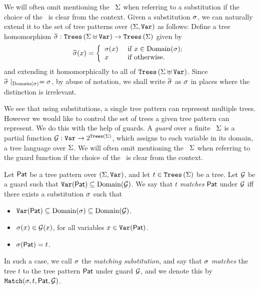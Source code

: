 We will often omit mentioning the \rab\ $\Sigma$ when referring to a substitution if the choice of the \rab\ is clear from the context.
Given a substitution $\sigma$, we can naturally extend it to the set of tree patterns over $(\Sigma, \texttt{Var})$ as follows: Define a tree homomorphism $\widetilde{\sigma} : \texttt{Trees}\left(\Sigma \uplus \texttt{Var}\right) \to \texttt{Trees}\left(\Sigma\right)$ given by
\[ \widetilde{\sigma}(x) = \left\{ \begin{array}{ll} \sigma(x) & \mbox{ if } x \in \operatorname{Domain}(\sigma);\\ x & \mbox{ if } \mbox{otherwise}. \end{array} \right. \]
and extending it homomorphically to all of $\texttt{Trees}\left(\Sigma \uplus \texttt{Var}\right)$.
Since $\widetilde{\sigma} \mid_{\operatorname{Domain}(\sigma)} = \sigma$, by abuse of notation, we  shall write $\widetilde{\sigma}$ as $\sigma$ in places where the distinction is irrelevant.

We see that using substitutions, a single tree pattern can represent multiple trees. However we would like to control the set of trees a given tree pattern can represent. We do this with the help of guards. A \emph{guard} over a finite \rab\ $\Sigma$ is a partial function $\mathcal{G} : \texttt{Var} \to 2^{\texttt{Trees}\left(\Sigma\right)}$, which assigns to each variable in its domain, a tree language over $\Sigma$. We will often omit mentioning the \rab\ $\Sigma$ when referring to the guard function if the choice of the \rab\ is clear from the context.


\begin{definition}[Match]\label{def:match}
    Let $\mathsf{Pat}$ be a tree pattern over $(\Sigma, \texttt{Var})$, and let $t \in \texttt{Trees}\left(\Sigma\right)$ be a tree. Let $\mathcal{G}$ be a guard such that $\texttt{Var}(\mathsf{Pat}) \subseteq \operatorname{Domain}(\mathcal{G})$. We say that $t$ \emph{matches} $\mathsf{Pat}$ under $\mathcal{G}$ iff there exists a substitution $\sigma$ such that
    \begin{itemize}
        \item $\texttt{Var}(\mathsf{Pat}) \subseteq \operatorname{Domain}(\sigma) \subseteq \operatorname{Domain}(\mathcal{G})$.
        \item $\sigma(x) \in \mathcal{G}(x)$, for all variables $x \in \texttt{Var}(\mathsf{Pat})$.
        \item $\sigma(\mathsf{Pat}) = t$.
    \end{itemize}
    In such a case, we call $\sigma$ the \emph{matching substitution}, and say that $\sigma$ \emph{matches} the tree $t$ to the tree pattern $\mathsf{Pat}$ under guard $\mathcal{G}$, and we denote this by $\texttt{Match}(\sigma, t, \mathsf{Pat}, \mathcal{G})$.
\end{definition}


